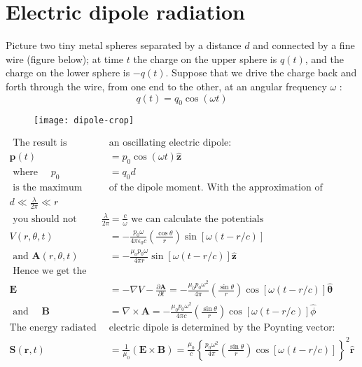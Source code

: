  \section{Electric dipole radiation}
 Picture two tiny metal spheres separated by a distance $d$ and connected by a fine wire (figure below); at time $t$ the charge on the upper sphere is $q(t)$, and the charge on the lower sphere is $-q(t)$. Suppose that we drive the charge back and forth through the wire, from one end to the other, at an angular frequency $\omega$ :
 $$
 q(t)=q_{0} \cos (\omega t)
 $$
 \begin{figure}[H]
 	\centering
 	\texttt{[image: dipole-crop]}
 	\caption{}
 	\label{}
 \end{figure}
\begin{align*}
\text{ The result is }&\text{an oscillating electric dipole:}\\
 \mathbf{p}(t)&=p_{0} \cos (\omega t) \hat{\mathbf{z}}\\
\text{ where }\quad
 p_{0}&=q_{0} d\\
\text{ is the maximum value }&\text{of the dipole moment.
	With the approximation of}\\
 d \ll \frac{\lambda}{2 \pi} \ll r\\
\text{ you should not forget that }\frac{\lambda}{2 \pi}&=\frac{c}{\omega}\text{ we can calculate the potentials}\\
 V(r, \theta, t)&=-\frac{p_{0} \omega}{4 \pi \epsilon_{0} c}\left(\frac{\cos \theta}{r}\right) \sin [\omega(t-r / c)]\\
\text{ and }
 \mathbf{A}(r, \theta, t)&=-\frac{\mu_{0} p_{0} \omega}{4 \pi r} \sin [\omega(t-r / c)] \hat{\mathbf{z}}\\
\text{ Hence we get the fields }\\
 \mathbf{E}&=-\nabla V-\frac{\partial \mathbf{A}}{\partial t}=-\frac{\mu_{0} p_{0} \omega^{2}}{4 \pi}\left(\frac{\sin \theta}{r}\right) \cos [\omega(t-r / c)] \hat{\boldsymbol{\theta}}\\
\text{ and }\quad
 \mathbf{B}&=\nabla \times \mathbf{A}=-\frac{\mu_{0} p_{0} \omega^{2}}{4 \pi c}\left(\frac{\sin \theta}{r}\right) \cos [\omega(t-r / c)] \hat{\phi}\\
 \text{The energy radiated by an oscillating }&\text{electric dipole is determined by the Poynting vector:}\\
 \mathbf{S}(\mathbf{r}, t)&=\frac{1}{\mu_{0}}(\mathbf{E} \times \mathbf{B})=\frac{\mu_{0}}{c}\left\{\frac{p_{0} \omega^{2}}{4 \pi}\left(\frac{\sin \theta}{r}\right) \cos [\omega(t-r / c)]\right\}^{2} \hat{\mathbf{r}}\\

\end{align*}
